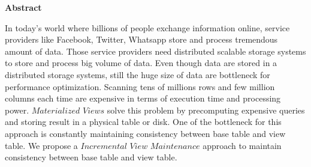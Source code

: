 

\clearemptydoublepage
{}
{}	





\vspace*{2cm}
\begin{center}
{\Large \bf Abstract}
\end{center}
\vspace{1cm}

In today's world where billions of people exchange information online, service providers like Facebook, Twitter, Whatsapp store and process tremendous amount of data. Those service providers need distributed scalable storage systems to store and process big volume of data. Even though data are stored in a distributed storage systems, still the huge size of data are bottleneck for performance optimization. Scanning tens of millions rows and few million columns each time are expensive in terms of execution time and processing power. $Materialized$ $Views$ solve this problem by precomputing expensive queries and storing result in a physical table or disk. One of the bottleneck for this approach is constantly maintaining consistency between base table and view table. We propose a $Incremental$ $View$ $Maintenance$ approach to maintain consistency between base table and view table.
